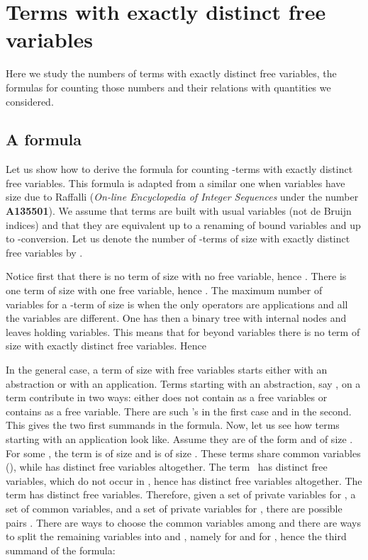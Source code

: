\documentclass{jfp1}
\begin{document}
\appendix

\section{Terms with exactly  distinct free variables}
\label{sec:number-terms-with}

Here we study the numbers of terms with exactly  distinct
free variables, the formulas for counting those numbers and their relations with
quantities we considered.

\subsection{A formula}
\label{sec:formula}

Let us show how to derive the formula for counting -terms with exactly 
distinct free variables.  This formula is adapted from a similar one when variables
have size  due to Raffalli (\emph{On-line Encyclopedia of Integer Sequences}
under the number \textbf{A135501}).  We assume that terms are built with usual variables
(not de Bruijn indices) and that they are equivalent up to a renaming of bound variables
and up to -conversion.  Let us denote the number of -terms of size  with
exactly  distinct free variables by .

Notice first that there is no term of size  with no free variable, hence .  There is one term of size  with one free variable, hence .  The maximum number of variables for
a -term of size  is when the only operators are applications and all the
variables are different.  One has then a binary tree with  internal nodes and
 leaves holding  variables.  This means that for  beyond  variables
there is no term of size  with exactly  distinct free variables.  Hence


In the general case, a term of size  with  free variables starts either with
an abstraction or with an application. Terms starting with an abstraction, say , on a term  contribute in two ways: either  does not contain  as a free
variables or  contains  as a free variable.  There are  such 's in
the first case and  in the second.  This gives the two first summands
 in the formula.  Now, let us see how terms starting with an
application look like.  Assume they are of the form  and of size .  For
some , the term  is of size  and  is of size .  These
terms share  common variables (), while  has  distinct
free variables altogether.  The term~ has  distinct free variables, which do not occur in ,
hence  has  distinct free variables altogether.  The term  has 
distinct free variables.  Therefore, given a set of private variables for , a set of
common variables, and a set of private variables for , there are  possible pairs .  There are  ways to choose the 
common variables among  and there are  ways to split the
remaining variables into  and , namely  for  and  for , hence
the third summand of the formula:
\end{document}
